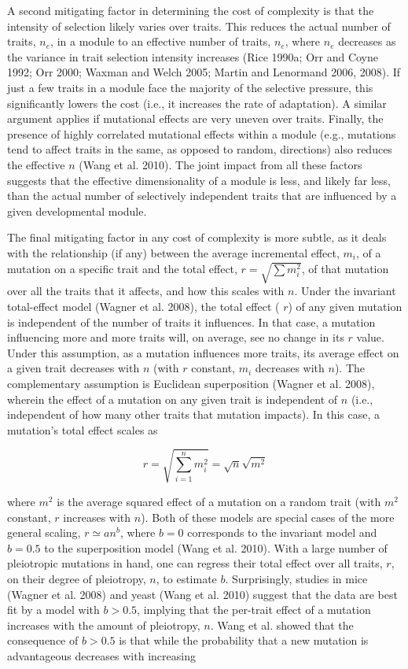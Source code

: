 \documentclass{article}
\begin{document}
A second mitigating factor in determining the cost of complexity is that the intensity of selection likely varies over traits. This reduces the actual number of traits,  $ n_{e} $, in a module to an effective number of traits,  $ n_{e} $, where  $ n_{e} $ decreases as the variance in trait selection intensity increases (Rice 1990a; Orr and Coyne 1992; Orr 2000; Waxman and Welch 2005; Martin and Lenormand 2006, 2008). If just a few traits in a module face the majority of the selective pressure, this significantly lowers the cost (i.e., it increases the rate of adaptation). A similar argument applies if mutational effects are very uneven over traits. Finally, the presence of highly correlated mutational effects within a module (e.g., mutations tend to affect traits in the same, as opposed to random, directions) also reduces the effective  $ n $ (Wang et al. 2010). The joint impact from all these factors suggests that the effective dimensionality of a module is less, and likely far less, than the actual number of selectively independent traits that are influenced by a given developmental module.

The final mitigating factor in any cost of complexity is more subtle, as it deals with the relationship (if any) between the average incremental effect,  $ m_i $, of a mutation on a specific trait and the total effect,  $ r = \sqrt{\sum m_i^2} $, of that mutation over all the traits that it affects, and how this scales with  $ n $. Under the invariant total-effect model (Wagner et al. 2008), the total effect ( $ r $) of any given mutation is independent of the number of traits it influences. In that case, a mutation influencing more and more traits will, on average, see no change in its  $ r $ value. Under this assumption, as a mutation influences more traits, its average effect on a given trait decreases with  $ n $ (with  $ r $ constant,  $ m_i $ decreases with  $ n $). The complementary assumption is Euclidean superposition (Wagner et al. 2008), wherein the effect of a mutation on any given trait is independent of  $ n $ (i.e., independent of how many other traits that mutation impacts). In this case, a mutation’s total effect scales as

\begin{equation}
r=\sqrt{\sum_{i=1}^{n}m_{i}^{2}}=\sqrt{n}\sqrt{m^{2}}
\end{equation}

where $m^2$ is the average squared effect of a mutation on a random trait (with $m^2$ constant, $r$ increases with $n$). Both of these models are special cases of the more general scaling, $r \simeq a n^b$, where $b = 0$ corresponds to the invariant model and $b = 0.5$ to the superposition model (Wang et al. 2010). With a large number of pleiotropic mutations in hand, one can regress their total effect over all traits, $r$, on their degree of pleiotropy, $n$, to estimate $b$. Surprisingly, studies in mice (Wagner et al. 2008) and yeast (Wang et al. 2010) suggest that the data are best fit by a model with $b > 0.5$, implying that the per-trait effect of a mutation increases with the amount of pleiotropy, $n$. Wang et al. showed that the consequence of $b > 0.5$ is that while the probability that a new mutation is advantageous decreases with increasing
\end{document}
